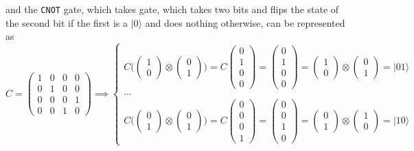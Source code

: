 \documentclass{article}
\theoremstyle{definition}
\begin{document}
    and the \texttt{CNOT} gate, which takes gate, which takes two bits and flips the state of the second bit if the first is a $|0\rangle$ and does nothing otherwise, can be represented as 
      \[
        C = \begin{pmatrix} 1&0&0&0\\0&1&0&0\\0&0&0&1\\0&0&1&0 \end{pmatrix} \implies \begin{cases} C \Bigg( \begin{pmatrix} 1 \\ 0 \end{pmatrix} \otimes \begin{pmatrix} 0 \\ 1 \end{pmatrix} \Bigg) = C \begin{pmatrix} 0\\1\\0\\0 \end{pmatrix} = \begin{pmatrix} 0\\1\\0\\0 \end{pmatrix} = \begin{pmatrix} 1 \\ 0 \end{pmatrix} \otimes \begin{pmatrix} 0 \\ 1 \end{pmatrix} = |01\rangle\\
        \ldots \\
        C \Bigg( \begin{pmatrix} 0 \\ 1 \end{pmatrix} \otimes \begin{pmatrix} 0 \\ 1 \end{pmatrix} \Bigg) = C \begin{pmatrix} 0\\0\\0\\1 \end{pmatrix} = \begin{pmatrix} 0\\0\\1\\0 \end{pmatrix} = \begin{pmatrix} 0 \\ 1 \end{pmatrix} \otimes \begin{pmatrix} 1 \\ 0 \end{pmatrix} = |10\rangle 
        \end{cases}
      \]
\end{document}
